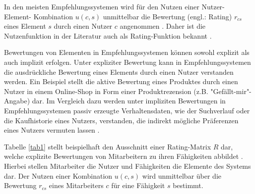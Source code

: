 In den meisten Empfehlungssystemen wird für den Nutzen einer Nutzer- Element- Kombination $u(c,s)$ unmittelbar die Bewertung (engl.: Rating) $r_{cs}$ eines Element $s$ durch einen Nutzer $c$ angenommen \cite[S. 735]{adomavicius:inproceedings}\cite[S. 9]{ricci:book}\cite[S. 11]{recommenderSystems:2016}.
Daher ist die Nutzenfunktion in der Literatur auch als Rating-Funktion bekannt \cite[S. 49]{adomavicius:inproceedings:2}.

Bewertungen von Elementen in Empfehlungssystemen können sowohl explizit als auch implizit erfolgen.
Unter expliziter Bewertung kann in Empfehlungssystemen die ausdrückliche Bewertung eines Elements durch einen Nutzer verstanden werden.
Ein Beispiel stellt die aktive Bewertung eines Produktes durch einen Nutzer in einem Online-Shop in Form einer Produktrezension (z.B. "Gefällt-mir"-Angabe) dar.
Im Vergleich dazu werden unter impliziten Bewertungen in Empfehlungssystemen passiv erzeugte Verhaltensdaten, wie der Suchverlauf oder die Kaufhistorie eines Nutzers, verstanden, die indirekt mögliche Präferenzen eines Nutzers vermuten lassen \cite[S. 149]{jadidinejad:inproceedings}\cite[S. 403]{unternährer:article}.

Tabelle \ref{tab1} stellt beispielhaft den Ausschnitt einer Rating-Matrix $R$ dar, welche explizite Bewertungen von Mitarbeitern zu ihren Fähigkeiten abbildet \cite[S. 735]{adomavicius:inproceedings}\cite[S. 16]{link:booklet}.
Hierbei stellen Mitarbeiter die Nutzer und Fähigkeiten die Elemente des Systems dar.
Der Nutzen einer Kombination $u(c,s)$ wird unmittelbar über die Bewertung $r_{cs}$ eines Mitarbeiters $c$ für eine Fähigkeit $s$ bestimmt.

